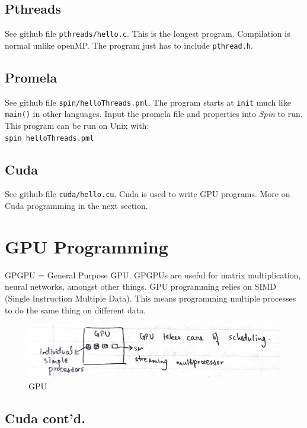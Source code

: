 \documentclass[twoside]{article}
\begin{document}
\subsection{Pthreads}

See github file {\tt pthreads/hello.c}. This is the longest program. Compilation is normal unlike openMP. The program just has to include {\tt pthread.h}. 

\subsection{Promela}

See github file {\tt spin/helloThreads.pml}. The program starts at {\tt init} much like {\tt main()} in other languages. Input the promela file and properties into {\em Spin} to run.\\
This program can be run on Unix with:\\
{\tt spin helloThreads.pml}

\subsection{Cuda}

See github file {\tt cuda/hello.cu}. Cuda is used to write GPU programs. More on Cuda programming in the next section.


\section{GPU Programming}

GPGPU = General Purpose GPU. GPGPUs are useful for matrix multiplication, neural networks, amongst other things.
GPU programming relies on SIMD (Single Instruction Multiple Data). This means programming multiple processes to do the same thing on different data.

\begin{figure}[h!]
\centering
\includegraphics[width=150mm]{gpu}
\caption{GPU}
\label{fig:method}
\end{figure}

\subsection{Cuda cont'd.}
\end{document}
